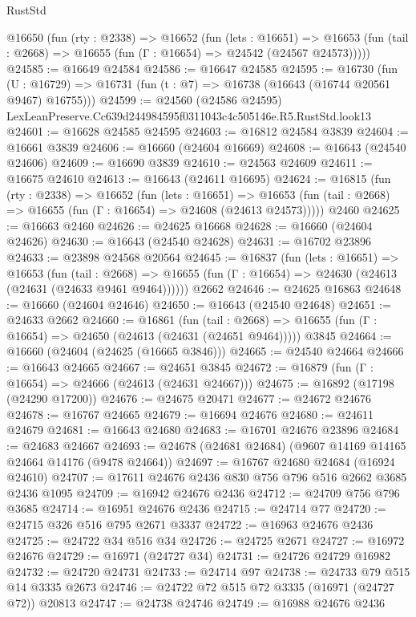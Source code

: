 \begin{lexlean}{RustStd}
\begin{coremodule}
  @16650
    (fun (rty : @2338) =>
    @16652
      (fun (lets : @16651) =>
      @16653 (fun (tail : @2668) => @16655 (fun (Γ : @16654) => @24542 (@24567 @24573)))))
@24585 := @16649 @24584
@24586 := @16647 @24585
@24595 := @16730
    (fun (U : @16729) => @16731 (fun (t : @7) => @16738 (@16643 (@16744 @20561 @9467) @16755)))
@24599 := @24560 (@24586 @24595) LexLeanPreserve.Cc639d244984595f0311043c4c505146e.R5.RustStd.look13
@24601 := @16628 @24585 @24595
@24603 := @16812 @24584 @3839
@24604 := @16661 @3839
@24606 := @16660 (@24604 @16669)
@24608 := @16643 (@24540 @24606)
@24609 := @16690 @3839
@24610 := @24563 @24609
@24611 := @16675 @24610
@24613 := @16643 (@24611 @16695)
@24624 := @16815
    (fun (rty : @2338) =>
    @16652
      (fun (lets : @16651) =>
      @16653 (fun (tail : @2668) => @16655 (fun (Γ : @16654) => @24608 (@24613 @24573)))))
    @2460
@24625 := @16663 @2460
@24626 := @24625 @16668
@24628 := @16660 (@24604 @24626)
@24630 := @16643 (@24540 @24628)
@24631 := @16702 @23896
@24633 := @23898 @24568 @20564
@24645 := @16837
    (fun (lets : @16651) =>
    @16653
      (fun (tail : @2668) =>
      @16655 (fun (Γ : @16654) => @24630 (@24613 (@24631 (@24633 @9461 @9464))))))
    @2662
@24646 := @24625 @16863
@24648 := @16660 (@24604 @24646)
@24650 := @16643 (@24540 @24648)
@24651 := @24633 @2662
@24660 := @16861
    (fun (tail : @2668) => @16655 (fun (Γ : @16654) => @24650 (@24613 (@24631 (@24651 @9464)))))
    @3845
@24664 := @16660 (@24604 (@24625 (@16665 @3846)))
@24665 := @24540 @24664
@24666 := @16643 @24665
@24667 := @24651 @3845
@24672 := @16879 (fun (Γ : @16654) => @24666 (@24613 (@24631 @24667)))
@24675 := @16892 (@17198 (@24290 @17200))
@24676 := @24675 @20471
@24677 := @24672 @24676
@24678 := @16767 @24665
@24679 := @16694 @24676
@24680 := @24611 @24679
@24681 := @16643 @24680
@24683 := @16701 @24676 @23896
@24684 := @24683 @24667
@24693 := @24678 (@24681 @24684) (@9607 @14169 @14165 @24664 @14176 (@9478 @24664))
@24697 := @16767 @24680 @24684 (@16924 @24610)
@24707 := @17611 @24676 @2436 @830 @756 @796 @516 @2662 @3685 @2436 @1095
@24709 := @16942 @24676 @2436
@24712 := @24709 @756 @796 @3685
@24714 := @16951 @24676 @2436
@24715 := @24714 @77
@24720 := @24715 @326 @516 @795 @2671 @3337
@24722 := @16963 @24676 @2436
@24725 := @24722 @34 @516 @34
@24726 := @24725 @2671
@24727 := @16972 @24676
@24729 := @16971 (@24727 @34)
@24731 := @24726 @24729 @16982
@24732 := @24720 @24731
@24733 := @24714 @97
@24738 := @24733 @79 @515 @14 @3335 @2673
@24746 := @24722 @72 @515 @72 @3335 (@16971 (@24727 @72)) @20813
@24747 := @24738 @24746
@24749 := @16988 @24676 @2436

\end{coremodule}
\end{lexlean}
